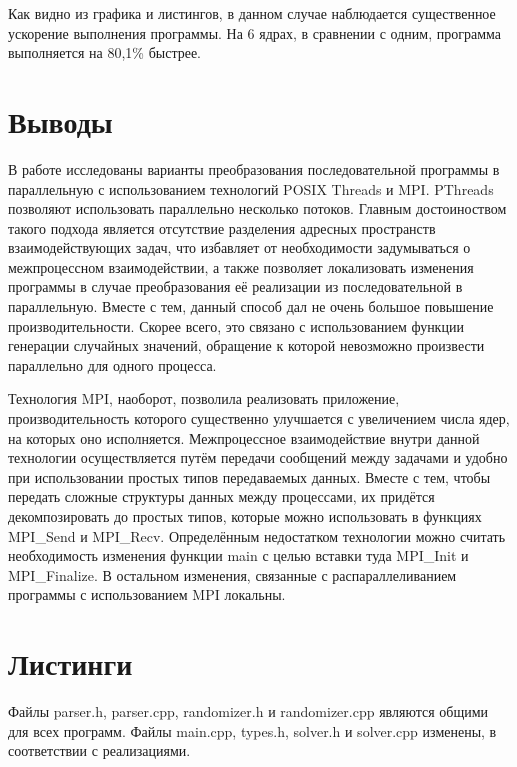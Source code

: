 Как видно из графика и листингов, в данном случае наблюдается существенное ускорение выполнения программы. На 6 ядрах, в сравнении с одним, программа выполняется на 80,1\% быстрее.


\section{Выводы}

В работе исследованы варианты преобразования последовательной программы в параллельную с использованием технологий POSIX Threads и MPI. PThreads позволяют использовать параллельно несколько потоков. Главным достоиноством такого подхода является отсутствие разделения адресных пространств взаимодействующих задач, что  избавляет от необходимости задумываться о межпроцессном взаимодействии, а также позволяет локализовать изменения программы в случае преобразования её реализации из последовательной в параллельную. Вместе с тем, данный способ дал не очень большое повышение производительности. Скорее всего, это связано с использованием функции генерации случайных значений, обращение к которой невозможно произвести параллельно для одного процесса.

Технология MPI, наоборот, позволила реализовать приложение, производительность которого существенно улучшается с увеличением числа ядер, на которых оно исполняется. Межпроцессное взаимодействие внутри данной технологии осуществляется путём передачи сообщений между задачами и удобно при использовании простых типов передаваемых данных. Вместе с тем, чтобы передать сложные структуры данных между процессами, их придётся декомпозировать до простых типов, которые можно использовать в функциях MPI\_Send и MPI\_Recv. Определённым недостатком технологии можно считать необходимость изменения функции main с целью вставки туда MPI\_Init и MPI\_Finalize. В остальном изменения, связанные с распараллеливанием программы с использованием MPI локальны.


\section{Листинги}

Файлы parser.h, parser.cpp, randomizer.h и randomizer.cpp являются общими для всех программ. Файлы main.cpp, types.h, solver.h и solver.cpp изменены, в соответствии с реализациями.

